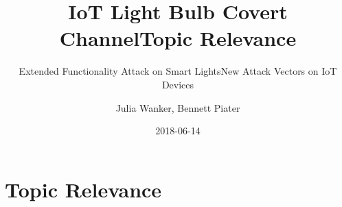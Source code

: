 \documentclass[11pt,t,usepdftitle=false,aspectratio=169]{beamer}
\title[IoT Light Bulb Attack]{IoT Light Bulb Covert Channel}
\subtitle{Extended Functionality Attack on Smart Lights}
\author[Julia Wanker \& Bennett Piater]{Julia Wanker, Bennett Piater}
\date{2018-06-14}
\begin{document}




\section{Topic Relevance} %
\label{sec:relevance}
\title{Topic Relevance}
\subtitle{New Attack Vectors on IoT Devices}
\end{document}
